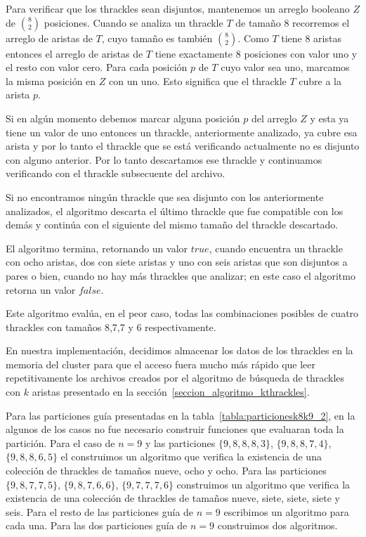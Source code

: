   Para verificar que los thrackles sean disjuntos, mantenemos un arreglo booleano $Z$ de
  $\binom{8}{2}$ posiciones. Cuando se analiza un thrackle $T$ de tamaño 8 recorremos el arreglo de
  aristas de $T$, cuyo tamaño es también $\binom{8}{2}$. Como $T$ tiene 8 aristas entonces el
  arreglo de aristas de $T$ tiene exactamente 8 posiciones con valor uno
  y el resto con valor cero. Para cada posición $p$ de $T$ cuyo valor sea uno, marcamos la misma
  posición en $Z$ con un uno. Esto significa que el thrackle $T$ cubre a la arista $p$.

  Si en algún momento debemos marcar alguna posición $p$ del arreglo $Z$ y esta ya tiene un valor
  de uno entonces un thrackle, anteriormente analizado, ya cubre esa arista y por lo tanto el
  thrackle que se está verificando actualmente no es disjunto con alguno anterior. Por lo tanto
  descartamos ese thrackle y continuamos verificando con el thrackle subsecuente del archivo.

  Si no encontramos ningún thrackle que sea disjunto con los anteriormente analizados, el
  algoritmo descarta el último thrackle que fue compatible con los demás y continúa con el
  siguiente del mismo tamaño del thrackle descartado.

  El algoritmo termina, retornando un valor $true$, cuando encuentra un thrackle con ocho
  aristas, dos con siete aristas y uno con seis aristas que son disjuntos a pares o bien, cuando
  no hay más thrackles que analizar; en este caso el algoritmo retorna un valor $false$.

  Este algoritmo evalúa, en el peor caso, todas las combinaciones posibles de cuatro
  thrackles con tamaños 8,7,7 y 6 respectivamente.


  En nuestra implementación, decidimos almacenar los datos de los thrackles en la memoria
  del cluster para que el acceso fuera mucho más rápido que leer repetitivamente los
  archivos creados por el algoritmo de búsqueda de thrackles con $k$ aristas presentado
  en la sección~\ref{seccion_algoritmo_kthrackles}.

  Para las particiones guía presentadas en la tabla~\ref{tabla:particionesk8k9_2}, en la
  algunos de los casos no fue necesario construir funciones que evaluaran toda la
  partición. Para el caso de $n=9$ y las particiones $\{9,8,8,8,3\}$, $\{9,8,8,7,4\}$, $\{9,8,8,6,5\}$ el
  construimos un algoritmo que verifica la existencia de una colección de thrackles de tamaños
  nueve, ocho y ocho. Para las particiones $\{9,8,7,7,5\}$, $\{9,8,7,6,6\}$, $\{9,7,7,7,6\}$ construimos
  un algoritmo que verifica la existencia de una colección de thrackles de tamaños nueve, siete,
  siete, siete y seis. Para el resto de las particiones guía de $n=9$ escribimos un algoritmo para
  cada una. Para las dos particiones guía de $n=9$ construimos dos algoritmos.

